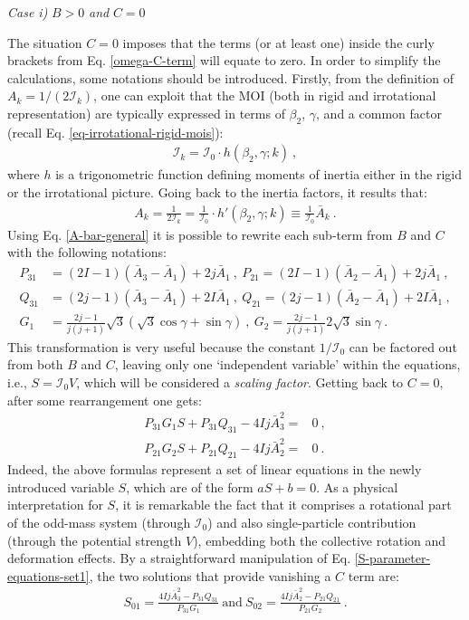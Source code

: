 \textit{Case i)} $B>0$ \textit{and} $C=0$

The situation $C=0$ imposes that the terms (or at least one) inside the curly brackets from Eq. \ref{omega-C-term} will equate to zero. In order to simplify the calculations, some notations should be introduced. Firstly, from the definition of $A_k=1/(2\mathcal{I}_k)$, one can exploit that the MOI (both in rigid and irrotational representation) are typically expressed in terms of $\beta_2$, $\gamma$, and a common factor (recall Eq. \ref{eq-irrotational-rigid-mois}):
\begin{align}
    \mathcal{I}_k=\mathcal{I}_0\cdot h(\beta_2,\gamma;k)\ ,
\end{align}
where $h$ is a trigonometric function defining moments of inertia either in the rigid or the irrotational picture. Going back to the inertia factors, it results that:
\begin{align}
    A_k=\frac{1}{2\mathcal{I}_k}=\frac{1}{\mathcal{I}_0}\cdot h'(\beta_2,\gamma;k)\equiv\frac{1}{\mathcal{I}_0}\bar{A}_k\ .
    \label{A-bar-general}
\end{align}
Using Eq. \ref{A-bar-general} it is possible to rewrite each sub-term from $B$ and $C$ with the following notations:
\begin{align}
    P_{31}&=(2I-1)(\bar{A}_3-\bar{A}_1)+2j\bar{A}_1\ ,\ P_{21}=(2I-1)(\bar{A}_2-\bar{A}_1)+2j\bar{A}_1\ , \nonumber\\
    Q_{31}&=(2j-1)(\bar{A}_3-\bar{A}_1)+2I\bar{A}_1\ ,\ Q_{21}=(2j-1)(\bar{A}_2-\bar{A}_1)+2I\bar{A}_1\ ,\nonumber\\
    G_1&=\frac{2j-1}{j(j+1)}\sqrt{3}\left(\sqrt{3}\cos\gamma+\sin\gamma\right)\ ,\ G_2=\frac{2j-1}{j(j+1)}2\sqrt{3}\sin\gamma\ .
    \label{P-Q-G1-G2-factors}
\end{align}
This transformation is very useful because the constant $1/\mathcal{I}_0$ can be factored out from both $B$ and $C$, leaving only one `independent variable' within the equations, i.e., $S=\mathcal{I}_0V$, which will be considered a \emph{scaling factor}. Getting back to $C=0$, after some rearrangement one gets:
\begin{align}
    P_{31}G_1S+P_{31}Q_{31}-4Ij\bar{A}_3^2=&0\ ,\nonumber\\
    P_{21}G_2S+P_{21}Q_{21}-4Ij\bar{A}_2^2=&0\ .
    \label{S-parameter-equations-set1}
\end{align}
Indeed, the above formulas represent a set of linear equations in the newly introduced variable $S$, which are of the form $aS+b=0$. As a physical interpretation for $S$, it is remarkable the fact that it comprises a rotational part of the odd-mass system (through $\mathcal{I}_0$) and also single-particle contribution (through the potential strength $V$), embedding both the collective rotation and deformation effects. By a straightforward manipulation of Eq. \ref{S-parameter-equations-set1}, the two solutions that provide vanishing a $C$ term are:
\begin{align}
    S_{01}=\frac{4Ij\bar{A}_3^2-P_{31}Q_{31}}{P_{31}G_1}\ \text{and}\ S_{02}=\frac{4Ij\bar{A}_2^2-P_{21}Q_{21}}{P_{21}G_2}\ .
    \label{C-Term-zero-solutions}
\end{align}

